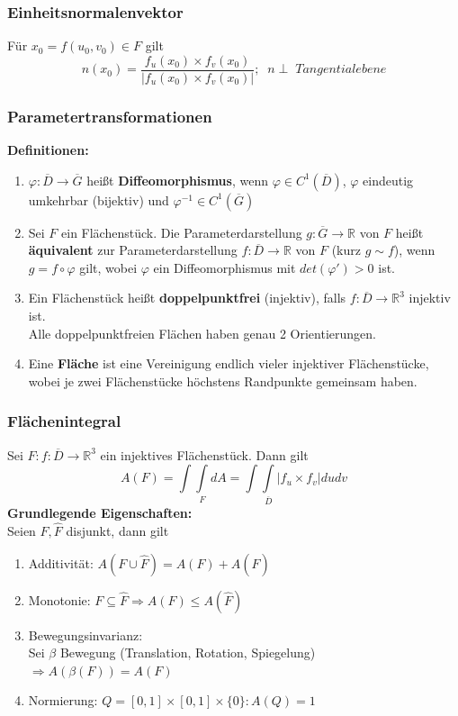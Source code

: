 \documentclass[a4paper,twocolumn,10pt]{article}
\begin{document}
\subsubsection{Einheitsnormalenvektor}
Für $x_0=f(u_0,v_0)\in F$ gilt
\begin{equation*}
n(x_0)=\frac{f_u(x_0)\times f_v(x_0)}{|f_u(x_0)\times f_v(x_0)|};\;\;n\perp\;Tangentialebene
\end{equation*}

\subsubsection{Parametertransformationen}
\textbf{Definitionen:}
\begin{enumerate}[label=$\bullet$]
\item $\varphi:\overline{D}\rightarrow\overline{G}$ heißt \textbf{Diffeomorphismus}, wenn $\varphi\in C^1(\overline{D})$, $\varphi$ eindeutig umkehrbar (bijektiv) und $\varphi^{-1}\in C^1(\overline{G})$
\item Sei $F$ ein Flächenstück. Die Parameterdarstellung $g:\overline{G}\rightarrow\mathbb{R}$ von $F$ heißt \textbf{äquivalent} zur Parameterdarstellung $f:\overline{D}\rightarrow\mathbb{R}$ von $F$ (kurz $g\sim f$), wenn $g=f\circ \varphi$ gilt, wobei $\varphi$ ein Diffeomorphismus mit $det(\varphi')>0$ ist.
\item Ein Flächenstück heißt \textbf{doppelpunktfrei} (injektiv), falls $f:\overline{D}\rightarrow\mathbb{R}^3$ injektiv ist.\\
Alle doppelpunktfreien Flächen haben genau 2 Orientierungen.
\item Eine \textbf{Fläche} ist eine Vereinigung endlich vieler injektiver Flächenstücke, wobei je zwei Flächenstücke höchstens Randpunkte gemeinsam haben.
\end{enumerate}

\subsubsection{Flächenintegral}
Sei $F:f:\overline{D}\rightarrow\mathbb{R}^3$ ein injektives Flächenstück. Dann gilt
\begin{equation*}
A(F)=\int\int\limits_{F}dA=\int\int\limits_{\overline{D}}|f_u\times f_v|dudv
\end{equation*}
\textbf{Grundlegende Eigenschaften:}\\
Seien $F,\hat{F}$ disjunkt, dann gilt
\begin{enumerate}[label=$\bullet$]
\item Additivität: $A(F\cup\hat{F})=A(F)+A(\hat{F})$
\item Monotonie: $F\subseteq \hat{F}\Rightarrow A(F)\leq A(\hat{F})$
\item Bewegungsinvarianz:\\
Sei $\beta$ Bewegung (Translation, Rotation, Spiegelung)\\
$\Rightarrow A(\beta(F))=A(F)$
\item Normierung: $Q=[0,1]\times [0,1]\times \{0\}: A(Q)=1$
\end{enumerate}
\end{document}
